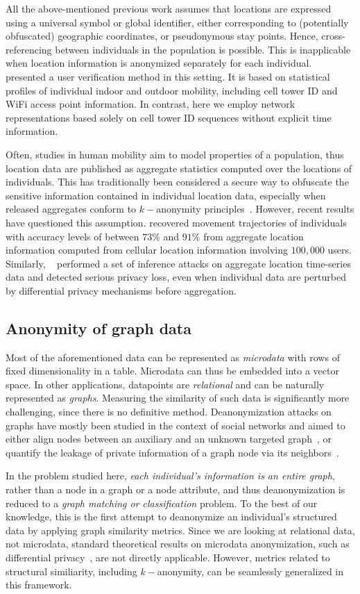 All the above-mentioned previous work assumes that locations are expressed using a universal symbol or global identifier, either corresponding to (potentially obfuscated) geographic coordinates, or pseudonymous stay points.
Hence, cross-referencing between individuals in the population is possible.
This is inapplicable when location information is anonymized separately for each individual.
\textcite{LinMobile} presented a user verification method in this setting.
It is based on statistical profiles of individual indoor and outdoor mobility, including cell tower ID and WiFi access point information.
In contrast, here we employ network representations based solely on cell tower ID sequences without explicit time information.

Often, studies in human mobility aim to model properties of a population, thus location data are published as aggregate statistics computed over the locations of individuals.
This has traditionally been considered a secure way to obfuscate the sensitive information contained in individual location data, especially when released aggregates conform to $ k-$anonymity principles~\citep{sweeney2002k}.
However, recent results have questioned this assumption.
\textcite{xu2017trajectory} recovered movement trajectories of individuals with accuracy levels of between $73\%$ and $91\%$ from aggregate location information computed from cellular location information involving $100,000$ users. Similarly, ~\textcite{pyrgelis2017does} performed a set of inference attacks on aggregate location time-series data and detected serious privacy loss, even when individual data are perturbed by differential privacy mechanisms before aggregation.

\subsection{Anonymity of graph data }
Most of the aforementioned data can be represented as \emph{microdata} with rows of fixed dimensionality in a table.
Microdata can thus be embedded into a vector space.
In other applications, datapoints are \emph{relational} and can be naturally represented as \emph{graphs}.
Measuring the similarity of such data is significantly more challenging, since there is no definitive method.
Deanonymization attacks on graphs have mostly been studied in the context of social networks and aimed to either align nodes between an auxiliary and an unknown targeted graph~\citep{narayanan2009anonymizing, sharad2014}, or quantify the leakage of private information of a graph node via its neighbors~\citep{zheleva09}.

In the problem studied here, \emph{each individual's information is an entire graph}, rather than a node in a graph or a node attribute, and thus deanonymization is reduced to a \emph{graph matching or classification} problem.
To the best of our knowledge, this is the first attempt to deanonymize an individual's structured data by applying graph similarity metrics.
Since we are looking at relational data, not microdata, standard theoretical results on microdata anonymization, such as differential privacy~\citep{dwork2006calibrating}, are not directly applicable.
However, metrics related to structural similiarity, including $k-$anonymity, can be seamlessly generalized in this framework.
